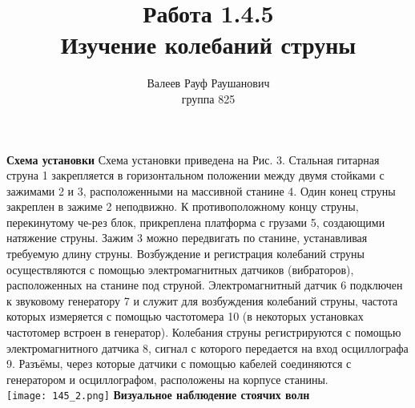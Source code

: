 \documentclass[a4paper, 12pt]{article}%
\author{Валеев Рауф Раушанович \\
группа 825}
\title{\textbf{Работа 1.4.5\\Изучение колебаний струны}}
\begin{document}
\maketitle
\newpage
\textbf{Схема установки}
Схема установки приведена на Рис. 3. Стальная гитарная струна 1 закрепляется в горизонтальном положении между двумя стойками с зажимами 2 и 3, расположенными на массивной станине 4. Один конец струны закреплен в зажиме 2 неподвижно. К противоположному концу струны, перекинутому че-рез блок, прикреплена платформа с грузами 5, создающими натяжение струны. Зажим 3 можно передвигать по станине, устанавливая требуемую длину струны. Возбуждение и регистрация колебаний струны осуществляются с помощью электромагнитных датчиков (вибраторов), расположенных на станине под струной. Электромагнитный датчик 6 подключен к звуковому генератору 7 и служит для возбуждения колебаний струны, частота которых измеряется с помощью частотомера 10 (в некоторых установках частотомер встроен в генератор). Колебания струны регистрируются с помощью электромагнитного датчика 8, сигнал с которого передается на вход осциллографа 9. Разъёмы, через которые датчики с помощью кабелей соединяются с генератором и осциллографом, расположены на корпусе станины.\\
\texttt{[image: 145\_2.png]}
\textbf{Визуальное наблюдение стоячих волн}
\end{document}
